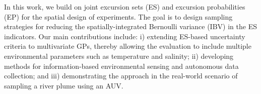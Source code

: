 \documentclass[aoas]{imsart}
\begin{document}






In this work, we build on joint excursion sets (ES) and excursion
probabilities (EP) for the spatial design of experiments. The goal is
to design sampling strategies for reducing the spatially-integrated
Bernoulli variance (IBV) in the ES indicators. Our main contributions
include: i) extending ES-based uncertainty criteria to multivariate
GPs, thereby allowing the evaluation to include multiple environmental
parameters such as temperature and salinity; ii) developing methods
for information-based environmental sensing and autonomous data
collection; and iii) demonstrating the approach in the real-world
scenario of sampling a river plume using an AUV.
\end{document}

